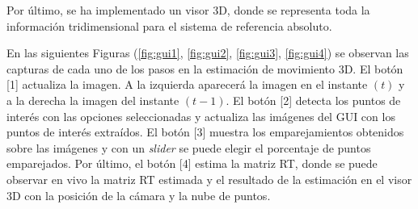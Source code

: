 Por último, se ha implementado un visor 3D, donde se representa toda la información tridimensional para el sistema de referencia absoluto.

En las siguientes Figuras (\ref{fig:gui1}, \ref{fig:gui2}, \ref{fig:gui3}, \ref{fig:gui4}) se observan las capturas de cada uno de los pasos en la estimación de movimiento 3D. El botón [1] actualiza la imagen. A la izquierda aparecerá la imagen en el instante $(t)$ y a la derecha la imagen del instante $(t-1)$. El botón [2] detecta los puntos de interés con las opciones seleccionadas y actualiza las imágenes del GUI con los puntos de interés extraídos. El botón [3] muestra los emparejamientos obtenidos sobre las imágenes y con un \textit{slider} se puede elegir el porcentaje de puntos emparejados. Por último, el botón [4] estima la matriz RT, donde se puede observar en vivo la matriz RT estimada y el resultado de la estimación en el visor 3D con la posición de la cámara y la nube de puntos.

%
%
%
%
%
